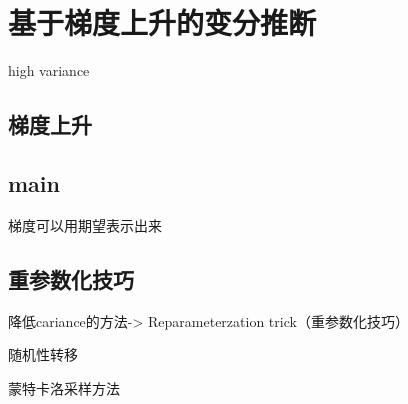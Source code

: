 \chapter{基于梯度上升的变分推断}

high variance

\section{梯度上升}

\section{main}

梯度可以用期望表示出来

\section{重参数化技巧}

降低cariance的方法-> Reparameterzation trick（重参数化技巧）

随机性转移

蒙特卡洛采样方法